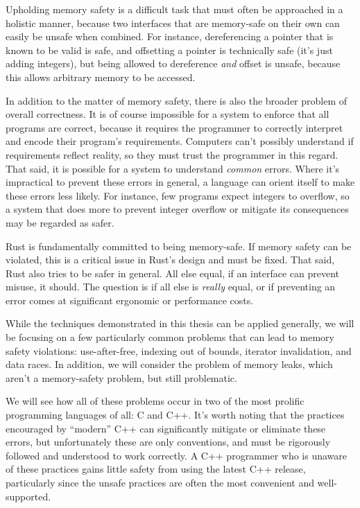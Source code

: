 Upholding memory safety is a difficult task that must often be approached in
a holistic manner, because two interfaces that are memory-safe on their own can easily
be unsafe when combined. For instance, dereferencing a pointer that is known
to be valid is safe, and offsetting a pointer is technically safe (it's just adding integers),
but being allowed to dereference \emph{and} offset is unsafe, because this allows
arbitrary memory to be accessed.

In addition to the matter of memory safety, there is also the broader problem
of overall correctness. It is of course impossible for a system to enforce
that all programs are correct, because it requires the programmer to
correctly interpret and encode their program's requirements. Computers can't
possibly understand if requirements reflect reality, so they must trust the
programmer in this regard. That said, it is possible for a system to understand
\emph{common} errors. Where it's impractical to prevent these errors in general,
a language can orient itself to make these errors less likely. For instance,
few programs expect integers to overflow, so a system that does more to prevent
integer overflow or mitigate its consequences may be regarded as safer.

Rust is fundamentally committed to being memory-safe. If memory safety can
be violated, this is a critical issue in Rust's design and must be fixed. That said,
Rust also tries to be safer in general. All else equal, if an interface can
prevent misuse, it should. The question is if all else is
\emph{really} equal, or if preventing an error comes at significant ergonomic or
performance costs.

While the techniques demonstrated in this thesis can be applied generally,
we will be focusing on a few particularly common problems that can lead to
memory safety violations: use-after-free, indexing out of bounds,
iterator invalidation, and data races. In addition, we will consider the problem of
memory leaks, which aren't a memory-safety problem, but still problematic.

We will see how all of these problems occur in two of the most prolific programming
languages of all: C and C++. It's worth noting that the practices encouraged
by ``modern'' C++ can significantly mitigate or eliminate these errors, but
unfortunately these are only conventions, and must be rigorously followed
and understood to work correctly. A C++ programmer who is unaware of these
practices gains little safety from using the latest C++ release, particularly
since the unsafe practices are often the most convenient and well-supported.




